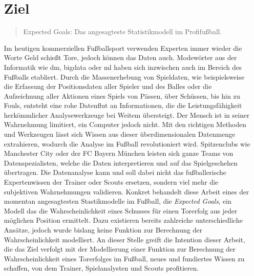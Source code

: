 \section{Ziel}

\begin{quote} 
\glqq Expected Goals: Das angesagteste Statistikmodell im Profifußball.\grqq{}
\end{quote}

Im heutigen kommerziellen Fußballsport verwenden Experten immer wieder die Worte \glqq Geld schießt Tore\grqq, jedoch können das Daten auch. Modewörter aus der Informatik wie \gls{dm}, \gls{bigdata} oder \gls{ml} haben sich inzwischen auch im Bereich des Fußballs etabliert. Durch die Massenerhebung von Spieldaten, wie beispielsweise die Erfassung der Positionsdaten aller Spieler und des Balles oder die Aufzeichnung aller Aktionen eines Spiels von Pässen, über Schüssen, bis hin zu Fouls, entsteht eine rohe Datenflut an Informationen, die die Leistungsfähigkeit herkömmlicher Analysewerkzeuge bei Weitem übersteigt. Der Mensch ist in seiner Wahrnehmung limitiert, ein Computer jedoch nicht. Mit den richtigen Methoden und Werkzeugen lässt sich Wissen aus dieser überdimensionalen Datenmenge extrahieren, wodurch die Analyse im Fußball revolutioniert wird. Spitzenclubs wie Manchester City oder der FC Bayern München leisten sich ganze Teams von Datenspezialisten, welche die Daten interpretieren und auf
das Spielgeschehen übertragen. Die Datenanalyse kann und soll dabei nicht das fußballerische Expertenwissen der Trainer oder Scouts ersetzen, sondern viel mehr die subjektiven Wahrnehmungen validieren. Konkret behandelt diese Arbeit eines der momentan angesagtesten Stastikmodelle im Fußball, die \textit{Expected Goals}, ein Modell das die Wahrscheinlichkeit eines Schusses für einen Torerfolg aus jeder möglichen Position ermittelt. Dazu existieren bereits zahlreiche unterschiedliche Ansätze, jedoch wurde bislang keine Funktion zur Berechnung der Wahrscheinlichkeit modelliert. An dieser Stelle greift die Intention dieser Arbeit, die das Ziel verfolgt mit der Modellierung einer Funktion zur Berechnung der Wahrscheinlichkeit eines Torerfolges im Fußball, neues und fundiertes Wissen zu schaffen, von dem Trainer, Spielanalysten und Scouts profitieren. 
	
